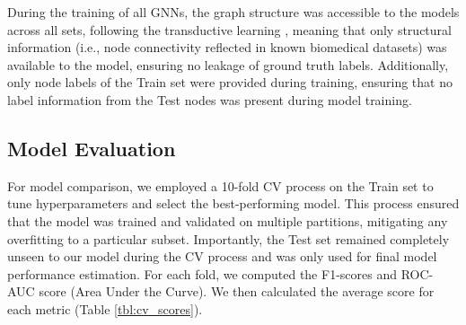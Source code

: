 \documentclass[journal,twoside,web]{ieeecolor}
\begin{document}
During the training of all GNNs, the graph structure was accessible to the models across all sets, following the transductive learning \cite{mishra2020node}, meaning that only structural information (i.e., node connectivity reflected in known biomedical datasets) was available to the model, ensuring no leakage of ground truth labels. 
Additionally, only node labels of the Train set were provided during training, ensuring that no label information from the Test nodes was present during model training.

\subsection{Model Evaluation}
For model comparison, we employed a 10-fold CV process on the Train set to tune hyperparameters and select the best-performing model. 
This process ensured that the model was trained and validated on multiple partitions, mitigating any overfitting to a particular subset. 
Importantly, the Test set remained completely unseen to our model during the CV process and was only used for final model performance estimation. 
For each fold, we computed the F1-scores and ROC-AUC score (Area Under the Curve). 
We then calculated the average score for each metric (Table \ref{tbl:cv_scores}).
\end{document}
